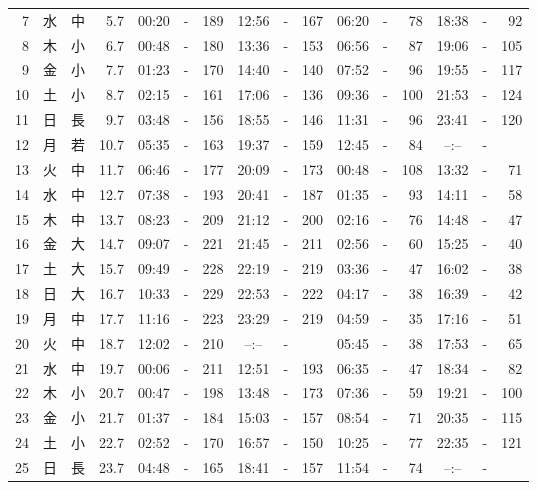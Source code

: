 \documentclass[12pt.a4j]{jsarticle}
\begin{document}
\begin{center}
\begin{table}[ht]
\begin{tabular}{|rc|cr|ccrccr|ccrccr|}
 7 & 水 & 中 &  5.7 &  00:20 &-& 189  &  12:56 &-& 167  &   06:20 &-&  78  &   18:38 &-&  92  \\
 8 & 木 & 小 &  6.7 &  00:48 &-& 180  &  13:36 &-& 153  &   06:56 &-&  87  &   19:06 &-& 105  \\
 9 & 金 & 小 &  7.7 &  01:23 &-& 170  &  14:40 &-& 140  &   07:52 &-&  96  &   19:55 &-& 117  \\
10 & 土 & 小 &  8.7 &  02:15 &-& 161  &  17:06 &-& 136  &   09:36 &-& 100  &   21:53 &-& 124  \\
11 & 日 & 長 &  9.7 &  03:48 &-& 156  &  18:55 &-& 146  &   11:31 &-&  96  &   23:41 &-& 120  \\
12 & 月 & 若 & 10.7 &  05:35 &-& 163  &  19:37 &-& 159  &   12:45 &-&  84  &   --:-- &-&     \\
13 & 火 & 中 & 11.7 &  06:46 &-& 177  &  20:09 &-& 173  &   00:48 &-& 108  &   13:32 &-&  71  \\
14 & 水 & 中 & 12.7 &  07:38 &-& 193  &  20:41 &-& 187  &   01:35 &-&  93  &   14:11 &-&  58  \\
15 & 木 & 中 & 13.7 &  08:23 &-& 209  &  21:12 &-& 200  &   02:16 &-&  76  &   14:48 &-&  47  \\
16 & 金 & 大 & 14.7 &  09:07 &-& 221  &  21:45 &-& 211  &   02:56 &-&  60  &   15:25 &-&  40  \\
17 & 土 & 大 & 15.7 &  09:49 &-& 228  &  22:19 &-& 219  &   03:36 &-&  47  &   16:02 &-&  38  \\
18 & 日 & 大 & 16.7 &  10:33 &-& 229  &  22:53 &-& 222  &   04:17 &-&  38  &   16:39 &-&  42  \\
19 & 月 & 中 & 17.7 &  11:16 &-& 223  &  23:29 &-& 219  &   04:59 &-&  35  &   17:16 &-&  51  \\
20 & 火 & 中 & 18.7 &  12:02 &-& 210  &  --:-- &-&     &   05:45 &-&  38  &   17:53 &-&  65  \\
21 & 水 & 中 & 19.7 &  00:06 &-& 211  &  12:51 &-& 193  &   06:35 &-&  47  &   18:34 &-&  82  \\
22 & 木 & 小 & 20.7 &  00:47 &-& 198  &  13:48 &-& 173  &   07:36 &-&  59  &   19:21 &-& 100  \\
23 & 金 & 小 & 21.7 &  01:37 &-& 184  &  15:03 &-& 157  &   08:54 &-&  71  &   20:35 &-& 115  \\
24 & 土 & 小 & 22.7 &  02:52 &-& 170  &  16:57 &-& 150  &   10:25 &-&  77  &   22:35 &-& 121  \\
25 & 日 & 長 & 23.7 &  04:48 &-& 165  &  18:41 &-& 157  &   11:54 &-&  74  &   --:-- &-&     \\

\end{tabular}
\end{table}
\end{center}
\end{document}

